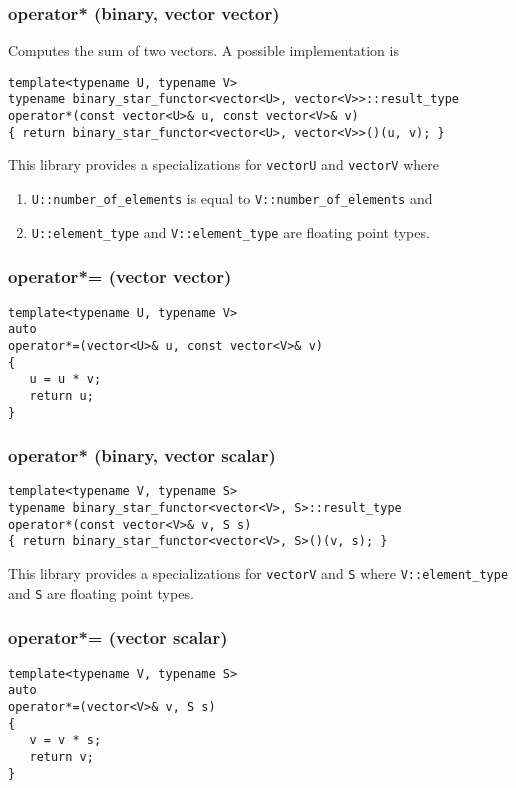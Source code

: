 \documentclass[oneside]{book}
\begin{document}
\subsubsection{operator* (binary, vector vector)}
Computes the sum of two vectors.
A possible implementation is
\begin{verbatim}
template<typename U, typename V>
typename binary_star_functor<vector<U>, vector<V>>::result_type
operator*(const vector<U>& u, const vector<V>& v)
{ return binary_star_functor<vector<U>, vector<V>>()(u, v); }
\end{verbatim}
This library provides a specializations for \texttt{vector\textlangle U\textrangle}
and \texttt{vector\textlangle V\textrangle} where
\begin{enumerate}
	\item \texttt{U::number\_of\_elements} is equal to \texttt{V::number\_of\_elements} and
	\item \texttt{U::element\_type} and \texttt{V::element\_type} are floating point types.
\end{enumerate}

\subsubsection{operator*= (vector vector)}
\begin{verbatim}
template<typename U, typename V>
auto
operator*=(vector<U>& u, const vector<V>& v)
{
   u = u * v;
   return u;
}
\end{verbatim}

\subsubsection{operator* (binary, vector scalar)}
\begin{verbatim}
template<typename V, typename S>
typename binary_star_functor<vector<V>, S>::result_type
operator*(const vector<V>& v, S s)
{ return binary_star_functor<vector<V>, S>()(v, s); }
\end{verbatim}
This library provides a specializations for \texttt{vector\textlangle V\textrangle}
and \texttt{S} where    \texttt{V::element\_type} and \texttt{S} are floating point
types.

\subsubsection{operator*= (vector scalar)}
\begin{verbatim}
template<typename V, typename S>
auto
operator*=(vector<V>& v, S s)
{
   v = v * s;
   return v;
}
\end{verbatim}
\end{document}
